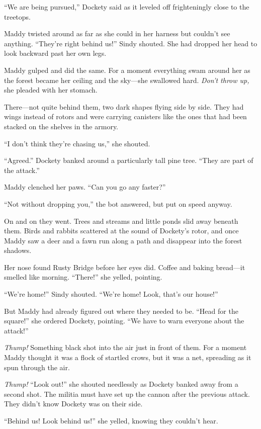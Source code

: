 \documentclass[10pt]{article}
\begin{document}
``We are being pursued,'' Dockety said as it leveled off frighteningly
close to the treetops.

Maddy twisted around as far as she could in her harness but couldn't see
anything. ``They're right behind us!'' Sindy shouted. She had dropped
her head to look backward past her own legs.

Maddy gulped and did the same. For a moment everything swam around her
as the forest became her ceiling and the sky---she swallowed hard.
\emph{Don't throw up,} she pleaded with her stomach.

There---not quite behind them, two dark shapes flying side by side. They
had wings instead of rotors and were carrying canisters like the ones
that had been stacked on the shelves in the armory.

``I don't think they're chasing us,'' she shouted.

``Agreed.'' Dockety banked around a particularly tall pine tree. ``They
are part of the attack.''

Maddy clenched her paws. ``Can you go any faster?''

``Not without dropping you,'' the bot answered, but put on speed anyway.

On and on they went. Trees and streams and little ponds slid away
beneath them. Birds and rabbits scattered at the sound of Dockety's
rotor, and once Maddy saw a deer and a fawn run along a path and
disappear into the forest shadows.

Her nose found Rusty Bridge before her eyes did. Coffee and baking
bread---it smelled like morning. ``There!'' she yelled, pointing.

``We're home!'' Sindy shouted. ``We're home! Look, that's our house!''

But Maddy had already figured out where they needed to be. ``Head for
the square!'' she ordered Dockety, pointing. ``We have to warn everyone
about the attack!''

\emph{Thump!} Something black shot into the air just in front of them.
For a moment Maddy thought it was a flock of startled crows, but it was
a net, spreading as it spun through the air.

\emph{Thump!} ``Look out!'' she shouted needlessly as Dockety banked
away from a second shot. The militia must have set up the cannon after
the previous attack. They didn't know Dockety was on their side.

``Behind us! Look behind us!'' she yelled, knowing they couldn't hear.
\end{document}
